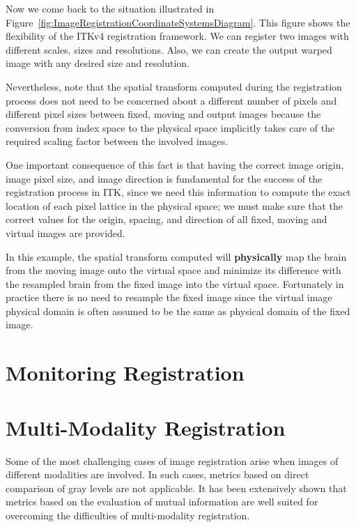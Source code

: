 Now we come back to the situation illustrated in
Figure~\ref{fig:ImageRegistrationCoordinateSystemsDiagram}. This figure shows
the flexibility of the ITKv4 registration framework. We can register two
images with different scales, sizes and resolutions. Also, we can create the
output warped image with any desired size and resolution.

Nevertheless, note that the spatial transform computed during the
registration process does not need to be concerned about a different number
of pixels and different pixel sizes between fixed, moving and output images
because the conversion from index space to the physical space implicitly
takes care of the required scaling factor between the involved images.

One important consequence of this fact is that having the correct image origin,
image pixel size, and image direction is fundamental for the success of the
registration process in ITK, since we need this information to compute the exact
location of each pixel lattice in the physical space; we must make sure
that the correct values for the origin, spacing, and direction of all
fixed, moving and virtual images are provided.

In this example, the spatial transform computed will \textbf{physically} map
the brain from the moving image onto the virtual space and minimize its
difference with the resampled brain from the fixed image into the virtual
space. Fortunately in practice there is no need to resample the fixed image
since the virtual image physical domain is often assumed to be the same as
physical domain of the fixed image.

\section{Monitoring Registration}
\label{sec:MonitoringImageRegistration}




\section{Multi-Modality Registration}
\label{sec:MultiModalityRegistration}

Some of the most challenging cases of image registration arise when images of
different modalities are involved. In such cases, metrics based on direct
comparison of gray levels are not applicable. It has been extensively shown
that metrics based on the evaluation of mutual information are well suited for
overcoming the difficulties of multi-modality registration.

